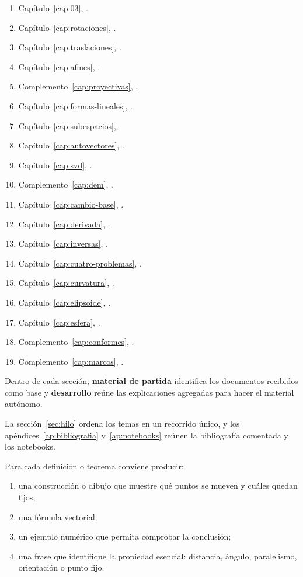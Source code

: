 \begin{enumerate}
  \item Capítulo~\ref{cap:03}, .
  \item Capítulo~\ref{cap:rotaciones}, .
  \item Capítulo~\ref{cap:traslaciones}, .
  \item Capítulo~\ref{cap:afines}, .
  \item Complemento~\ref{cap:proyectivas}, .
  \item Capítulo~\ref{cap:formas-lineales}, .
  \item Capítulo~\ref{cap:subespacios}, .
  \item Capítulo~\ref{cap:autovectores}, .
  \item Capítulo~\ref{cap:svd}, .
  \item Complemento~\ref{cap:dem}, .
  \item Capítulo~\ref{cap:cambio-base}, .
  \item Capítulo~\ref{cap:derivada}, .
  \item Capítulo~\ref{cap:inversas}, .
  \item Capítulo~\ref{cap:cuatro-problemas}, .
  \item Capítulo~\ref{cap:curvatura}, .
  \item Capítulo~\ref{cap:elipsoide}, .
  \item Capítulo~\ref{cap:esfera}, .
  \item Complemento~\ref{cap:conformes}, .
  \item Complemento~\ref{cap:marcos}, .
\end{enumerate}

Dentro de cada sección, \textbf{material de partida} identifica los documentos
recibidos como base y \textbf{desarrollo} reúne las explicaciones agregadas para hacer el
material autónomo.

La sección~\ref{sec:hilo} ordena los temas en un recorrido único, y los
apéndices~\ref{ap:bibliografia} y~\ref{ap:notebooks} reúnen la bibliografía comentada y los notebooks.

\begin{idea}
Para cada definición o teorema conviene producir:
\begin{enumerate}
  \item una construcción o dibujo que muestre qué puntos se mueven y cuáles quedan fijos;
  \item una fórmula vectorial;
  \item un ejemplo numérico que permita comprobar la conclusión;
  \item una frase que identifique la propiedad esencial: distancia, ángulo, paralelismo,
  orientación o punto fijo.
\end{enumerate}
\end{idea}

